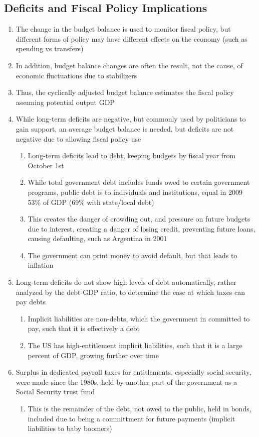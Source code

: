 \subsection{Deficits and Fiscal Policy Implications}
\begin{enumerate}
\item The change in the budget balance is used to monitor fiscal policy, but different forms of policy may have different effects on the economy (such as spending vs transfers)
\item In addition, budget balance changes are often the result, not the cause, of economic fluctuations due to stabilizers
\item Thus, the cyclically adjusted budget balance estimates the fiscal policy assuming potential output GDP
\item While long-term deficits are negative, but commonly used by politicians to gain support, an average budget balance is needed, but deficits are not negative due to allowing fiscal policy use
\begin{enumerate}
\item Long-term deficits lead to debt, keeping budgets by fiscal year from October 1st
\item While total government debt includes funds owed to certain government programs, public debt is to individuals and institutions, equal in 2009 53\% of GDP (69\% with state/local debt)
\item This creates the danger of crowding out, and pressure on future budgets due to interest, creating a danger of losing credit, preventing future loans, causing defaulting, such as Argentina in 2001 
\item The government can print money to avoid default, but that leads to inflation
\end{enumerate}
\item Long-term deficits do not show high levels of debt automatically, rather analyzed by the debt-GDP ratio, to determine the ease at which taxes can pay debts
\begin{enumerate}
\item Implicit liabilities are non-debts, which the government in committed to pay, such that it is effectively a debt
\item The US has high-entitlement implicit liabilities, such that it is a large percent of GDP, growing further over time
\end{enumerate}
\item Surplus in dedicated payroll taxes for entitlements, especially social security, were made since the 1980s, held by another part of the government as a Social Security trust fund
\begin{enumerate}
\item This is the remainder of the debt, not owed to the public, held in bonds, included due to being a committment for future payments (implicit liabilities to baby boomers)
\end{enumerate}
\end{enumerate}

